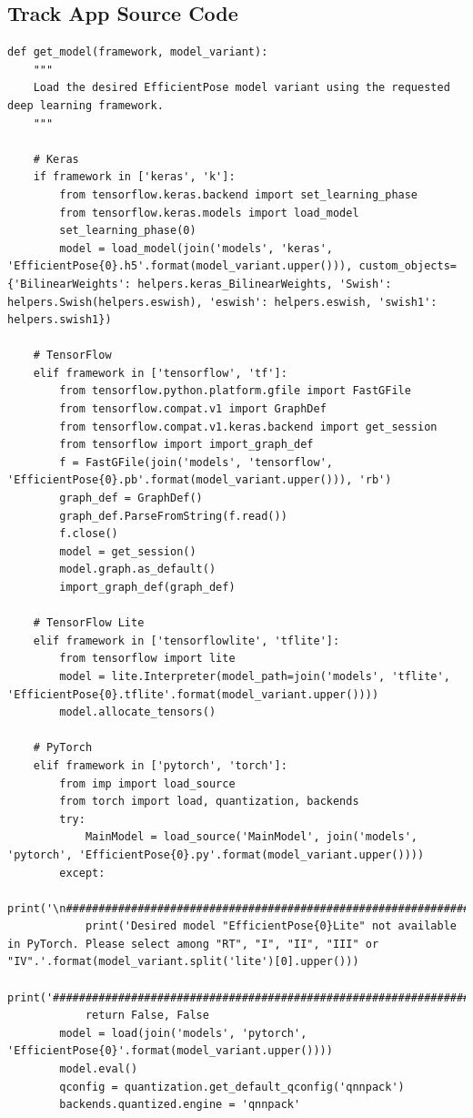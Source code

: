 \documentclass{fisatprojectfinal}
\begin{document}
\begin{appendices}
	\section{Track App Source Code}
	\begin{lstlisting}
def get_model(framework, model_variant):
    """
    Load the desired EfficientPose model variant using the requested deep learning framework.
    """
    
    # Keras
    if framework in ['keras', 'k']:
        from tensorflow.keras.backend import set_learning_phase
        from tensorflow.keras.models import load_model
        set_learning_phase(0)
        model = load_model(join('models', 'keras', 'EfficientPose{0}.h5'.format(model_variant.upper())), custom_objects={'BilinearWeights': helpers.keras_BilinearWeights, 'Swish': helpers.Swish(helpers.eswish), 'eswish': helpers.eswish, 'swish1': helpers.swish1})
    
    # TensorFlow
    elif framework in ['tensorflow', 'tf']:
        from tensorflow.python.platform.gfile import FastGFile
        from tensorflow.compat.v1 import GraphDef
        from tensorflow.compat.v1.keras.backend import get_session
        from tensorflow import import_graph_def
        f = FastGFile(join('models', 'tensorflow', 'EfficientPose{0}.pb'.format(model_variant.upper())), 'rb')
        graph_def = GraphDef()
        graph_def.ParseFromString(f.read())
        f.close()
        model = get_session()
        model.graph.as_default()
        import_graph_def(graph_def)
    
    # TensorFlow Lite
    elif framework in ['tensorflowlite', 'tflite']:
        from tensorflow import lite
        model = lite.Interpreter(model_path=join('models', 'tflite', 'EfficientPose{0}.tflite'.format(model_variant.upper())))
        model.allocate_tensors()
    
    # PyTorch
    elif framework in ['pytorch', 'torch']:
        from imp import load_source
        from torch import load, quantization, backends
        try:
            MainModel = load_source('MainModel', join('models', 'pytorch', 'EfficientPose{0}.py'.format(model_variant.upper())))
        except:
            print('\n##########################################################################################################')
            print('Desired model "EfficientPose{0}Lite" not available in PyTorch. Please select among "RT", "I", "II", "III" or "IV".'.format(model_variant.split('lite')[0].upper()))
            print('##########################################################################################################\n')
            return False, False
        model = load(join('models', 'pytorch', 'EfficientPose{0}'.format(model_variant.upper())))
        model.eval()
        qconfig = quantization.get_default_qconfig('qnnpack')
        backends.quantized.engine = 'qnnpack'
            

\end{lstlisting}
\end{appendices}
\end{document}

